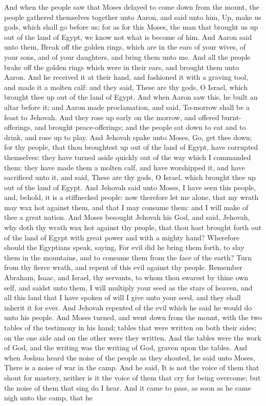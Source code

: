 And when the people saw that Moses delayed to come down from the mount, the people gathered themselves together unto Aaron, and said unto him, Up, make us gods, which shall go before us; for as for this Moses, the man that brought us up out of the land of Egypt, we know not what is become of him. And Aaron said unto them, Break off the golden rings, which are in the ears of your wives, of your sons, and of your daughters, and bring them unto me. And all the people brake off the golden rings which were in their ears, and brought them unto Aaron. And he received it at their hand, and fashioned it with a graving tool, and made it a molten calf: and they said, These are thy gods, O Israel, which brought thee up out of the land of Egypt. And when Aaron saw this, he built an altar before it; and Aaron made proclamation, and said, To-morrow shall be a feast to Jehovah. And they rose up early on the morrow, and offered burnt-offerings, and brought peace-offerings; and the people sat down to eat and to drink, and rose up to play.  And Jehovah spake unto Moses, Go, get thee down; for thy people, that thou broughtest up out of the land of Egypt, have corrupted themselves: they have turned aside quickly out of the way which I commanded them: they have made them a molten calf, and have worshipped it, and have sacrificed unto it, and said, These are thy gods, O Israel, which brought thee up out of the land of Egypt. And Jehovah said unto Moses, I have seen this people, and, behold, it is a stiffnecked people: now therefore let me alone, that my wrath may wax hot against them, and that I may consume them: and I will make of thee a great nation. And Moses besought Jehovah his God, and said, Jehovah, why doth thy wrath wax hot against thy people, that thou hast brought forth out of the land of Egypt with great power and with a mighty hand? Wherefore should the Egyptians speak, saying, For evil did he bring them forth, to slay them in the mountains, and to consume them from the face of the earth? Turn from thy fierce wrath, and repent of this evil against thy people. Remember Abraham, Isaac, and Israel, thy servants, to whom thou swarest by thine own self, and saidst unto them, I will multiply your seed as the stars of heaven, and all this land that I have spoken of will I give unto your seed, and they shall inherit it for ever. And Jehovah repented of the evil which he said he would do unto his people.  And Moses turned, and went down from the mount, with the two tables of the testimony in his hand; tables that were written on both their sides; on the one side and on the other were they written. And the tables were the work of God, and the writing was the writing of God, graven upon the tables. And when Joshua heard the noise of the people as they shouted, he said unto Moses, There is a noise of war in the camp. And he said, It is not the voice of them that shout for mastery, neither is it the voice of them that cry for being overcome; but the noise of them that sing do I hear. And it came to pass, as soon as he came nigh unto the camp, that he 